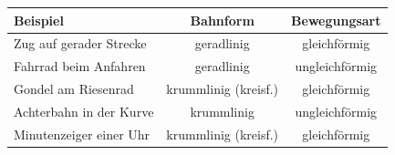 \documentclass[11pt, a4paper]{article}
\begin{document}
\begin{merkkasten}[title={\small\bfseries\textcolor{white}{Beispiele}}, coltitle=white, attach boxed title to top left={yshift=-2mm, xshift=5mm}, boxed title style={colback=physik, arc=0pt}]
\begin{center}
\renewcommand{\arraystretch}{1.3}
\begin{tabular}{|l|c|c|}
\hline
\textbf{Beispiel} & \textbf{Bahnform} & \textbf{Bewegungsart} \\
\hline
Zug auf gerader Strecke & geradlinig & gleichförmig \\
\hline
Fahrrad beim Anfahren & geradlinig & ungleichförmig \\
\hline
Gondel am Riesenrad & krummlinig (kreisf.) & gleichförmig \\
\hline
Achterbahn in der Kurve & krummlinig & ungleichförmig \\
\hline
Minutenzeiger einer Uhr & krummlinig (kreisf.) & gleichförmig \\
\hline
\end{tabular}
\end{center}
\end{merkkasten}
\end{document}

